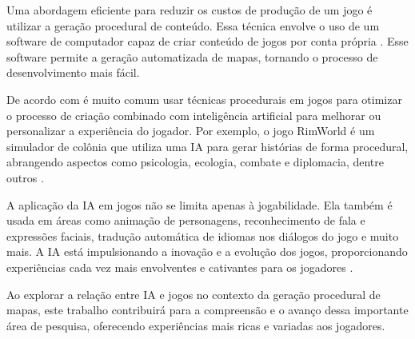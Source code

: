 Uma abordagem eficiente para reduzir os custos de produção de um jogo é utilizar a geração procedural de conteúdo. Essa técnica envolve o uso de um software de computador capaz de criar conteúdo de jogos por conta própria \cite{procedural_centent_book}. Esse software permite a geração automatizada de mapas, tornando o processo de desenvolvimento mais fácil.


De acordo com  é muito comum usar técnicas procedurais em jogos para otimizar o processo de criação combinado com inteligência artificial para melhorar ou personalizar a experiência do jogador. Por exemplo, o jogo RimWorld é um simulador de colônia que utiliza uma IA para gerar histórias de forma procedural, abrangendo aspectos como psicologia, ecologia, combate e diplomacia, dentre outros \cite{jogo_procedural}.

A aplicação da IA em jogos não se limita apenas à jogabilidade. Ela também é usada em áreas como animação de personagens, reconhecimento de fala e expressões faciais, tradução automática de idiomas nos diálogos do jogo e muito mais. A IA está impulsionando a inovação e a evolução dos jogos, proporcionando experiências cada vez mais envolventes e cativantes para os jogadores \cite{exameNvidia, omniverseace}.

Ao explorar a relação entre IA e jogos no contexto da geração procedural de mapas, este trabalho contribuirá para a compreensão e o avanço dessa importante área de pesquisa, oferecendo experiências mais ricas e variadas aos jogadores. 




